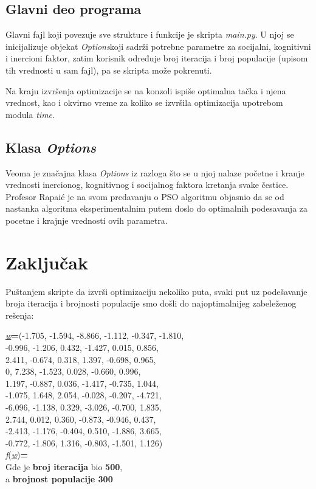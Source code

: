 \documentclass[12pt, a4paper]{article}
\newcommand{\vecw}{\underline{\textit{w}}}
\newcommand{\fw}{\textit{f}(\vecw)}
\begin{document}
    \subsection{Glavni deo programa}
        Glavni fajl koji povezuje sve strukture i funkcije je skripta \textit{main.py}. U njoj se inicijalizuje objekat \textit{Options}\space koji sadrži potrebne parametre za socijalni, kognitivni i inercioni faktor, zatim korisnik određuje broj iteracija i broj populacije (upisom tih vrednosti u sam fajl), pa se skripta može pokrenuti.
        
        Na kraju izvršenja optimizacije se na konzoli ispiše optimalna tačka i njena vrednost, kao i okvirno vreme za koliko se izvršila optimizacija upotrebom modula \textit{time}.
        
    \subsection{Klasa \textit{Options}}
    Veoma je značajna klasa \textit{Options} iz razloga što se u njoj nalaze početne i
    kranje vrednosti inercionog, kognitivnog i socijalnog faktora kretanja svake čestice.
    Profesor Rapaić je na svom predavanju o PSO algoritmu objasnio da se od nastanka algoritma eksperimentalnim putem doslo do optimalnih podesavanja za pocetne i krajnje vrednosti ovih parametra.
    

    
    \section{Zaključak}
    Puštanjem skripte da izvrši optimizaciju nekoliko puta, svaki put uz podešavanje broja iteracija i brojnosti populacije smo došli do najoptimalnijeg zabeleženog rešenja:\\

    \newpage
    \begin{center}
       \vecw\space \textbf{=}\space (-1.705, -1.594, -8.866, -1.112, -0.347, -1.810,\\
        -0.996, -1.206, 0.432, -1.427, 0.015, 0.856,\\
        2.411, -0.674, 0.318, 1.397, -0.698, 0.965,\\
        0, 7.238, -1.523, 0.028, -0.660, 0.996,\\
        1.197, -0.887, 0.036, -1.417, -0.735, 1.044,\\
        -1.075, 1.648, 2.054, -0.028, -0.207, -4.721,\\
        -6.096, -1.138, 0.329, -3.026, -0.700, 1.835,\\
        2.744, 0.012, 0.360, -0.873, -0.946, 0.437,\\
        -2.413, -1.176, -0.404, 0.510, -1.886, 3.665,\\
        -0.772, -1.806, 1.316, -0.803, -1.501, 1.126)\\
        \fw \textbf{=}\\ 
        Gde je \textbf{broj iteracija} bio \textbf{500},\\
        a \textbf{brojnost populacije 300}\\
    \end{center}
    
\end{document}
